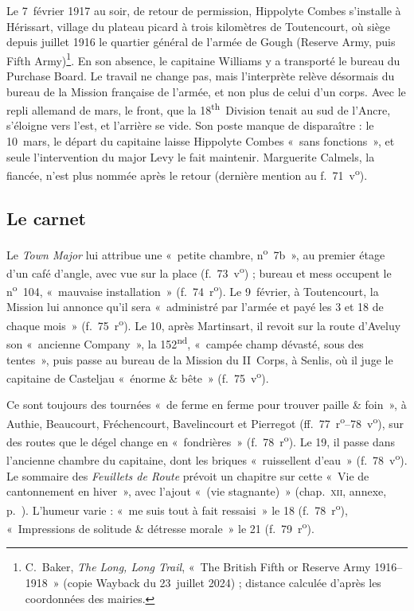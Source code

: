 
Le 7~février 1917 au soir, de retour de permission, Hippolyte Combes s'installe à Hérissart, village du plateau picard à trois kilomètres de Toutencourt, où siège depuis juillet 1916 le quartier général de l'armée de Gough (Reserve Army, puis Fifth Army)\footnote{C.~Baker, \textit{The Long, Long Trail}, «~The British Fifth or Reserve Army 1916--1918~» (copie Wayback du 23~juillet 2024) ; distance calculée d'après les coordonnées des mairies.}. En son absence, le capitaine Williams y a transporté le bureau du Purchase Board. Le travail ne change pas, mais l'interprète relève désormais du bureau de la Mission française de l'armée, et non plus de celui d'un corps. Avec le repli allemand de mars, le front, que la 18\textsuperscript{th}~Division tenait au sud de l'Ancre, s'éloigne vers l'est, et l'arrière se vide. Son poste manque de disparaître : le 10~mars, le départ du capitaine laisse Hippolyte Combes «~sans fonctions~», et seule l'intervention du major Levy le fait maintenir. Marguerite Calmels, la fiancée, n'est plus nommée après le retour (dernière mention au f.~71~v\textsuperscript{o}).

\subsection*{Le carnet}

Le \textit{Town Major} lui attribue une «~petite chambre, n\textsuperscript{o}~7b~», au premier étage d'un café d'angle, avec vue sur la place (f.~73~v\textsuperscript{o}) ; bureau et mess occupent le n\textsuperscript{o}~104, «~mauvaise installation~» (f.~74~r\textsuperscript{o}). Le 9~février, à Toutencourt, la Mission lui annonce qu'il sera «~administré par l'armée et payé les 3 et 18 de chaque mois~» (f.~75~r\textsuperscript{o}). Le 10, après Martinsart, il revoit sur la route d'Aveluy son «~ancienne Company~», la 152\textsuperscript{nd}, «~campée champ dévasté, sous des tentes~», puis passe au bureau de la Mission du II~Corps, à Senlis, où il juge le capitaine de Casteljau «~énorme \& bête~» (f.~75~v\textsuperscript{o}).

Ce sont toujours des tournées «~de ferme en ferme pour trouver paille \& foin~», à Authie, Beaucourt, Fréchencourt, Bavelincourt et Pierregot (ff.~77~r\textsuperscript{o}--78~v\textsuperscript{o}), sur des routes que le dégel change en «~fondrières~» (f.~78~r\textsuperscript{o}). Le 19, il passe dans l'ancienne chambre du capitaine, dont les briques «~ruissellent d'eau~» (f.~78~v\textsuperscript{o}). Le sommaire des \textit{Feuillets de Route} prévoit un chapitre sur cette «~Vie de cantonnement en hiver~», avec l'ajout «~(vie stagnante)~» (chap.~\textsc{xii}, annexe, p.~\pageref{annexe:doc6-xii}). L'humeur varie : «~me suis tout à fait ressaisi~» le 18 (f.~78~r\textsuperscript{o}), «~Impressions de solitude \& détresse morale~» le 21 (f.~79~r\textsuperscript{o}).

